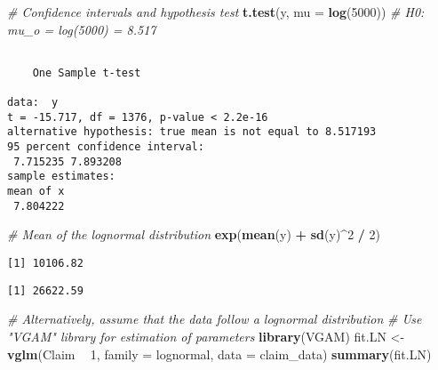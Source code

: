 \documentclass[]{book}
\newenvironment{Shaded}{\begin{snugshade}}{\end{snugshade}}
\newcommand{\KeywordTok}[1]{\textcolor[rgb]{0.13,0.29,0.53}{\textbf{#1}}}
\newcommand{\DataTypeTok}[1]{\textcolor[rgb]{0.13,0.29,0.53}{#1}}
\newcommand{\DecValTok}[1]{\textcolor[rgb]{0.00,0.00,0.81}{#1}}
\newcommand{\StringTok}[1]{\textcolor[rgb]{0.31,0.60,0.02}{#1}}
\newcommand{\CommentTok}[1]{\textcolor[rgb]{0.56,0.35,0.01}{\textit{#1}}}
\newcommand{\OperatorTok}[1]{\textcolor[rgb]{0.81,0.36,0.00}{\textbf{#1}}}
\newcommand{\NormalTok}[1]{#1}
\theoremstyle{definition}
\theoremstyle{definition}
\theoremstyle{definition}
\theoremstyle{remark}
\begin{document}
\begin{Shaded}
\begin{Highlighting}[]
\CommentTok{# Confidence intervals and hypothesis test}
\KeywordTok{t.test}\NormalTok{(y, }\DataTypeTok{mu =} \KeywordTok{log}\NormalTok{(}\DecValTok{5000}\NormalTok{))  }\CommentTok{# H0: mu_o = log(5000) = 8.517}
\end{Highlighting}
\end{Shaded}

\begin{verbatim}

    One Sample t-test

data:  y
t = -15.717, df = 1376, p-value < 2.2e-16
alternative hypothesis: true mean is not equal to 8.517193
95 percent confidence interval:
 7.715235 7.893208
sample estimates:
mean of x 
 7.804222 
\end{verbatim}

\begin{Shaded}
\begin{Highlighting}[]
\CommentTok{# Mean of the lognormal distribution}
\KeywordTok{exp}\NormalTok{(}\KeywordTok{mean}\NormalTok{(y) }\OperatorTok{+}\StringTok{ }\KeywordTok{sd}\NormalTok{(y)}\OperatorTok{^}\DecValTok{2} \OperatorTok{/}\StringTok{ }\DecValTok{2}\NormalTok{)}
\end{Highlighting}
\end{Shaded}

\begin{verbatim}
[1] 10106.82
\end{verbatim}

\begin{Shaded}
\end{Shaded}

\begin{verbatim}
[1] 26622.59
\end{verbatim}

\begin{Shaded}
\begin{Highlighting}[]
\CommentTok{# Alternatively, assume that the data follow a lognormal distribution}
\CommentTok{# Use "VGAM" library for estimation of parameters }
\KeywordTok{library}\NormalTok{(VGAM)}
\NormalTok{fit.LN <-}\StringTok{ }\KeywordTok{vglm}\NormalTok{(Claim }\OperatorTok{~}\StringTok{ }\DecValTok{1}\NormalTok{, }\DataTypeTok{family =}\NormalTok{ lognormal, }\DataTypeTok{data =}\NormalTok{ claim_data)}
\KeywordTok{summary}\NormalTok{(fit.LN)}
\end{Highlighting}
\end{Shaded}
\end{document}
